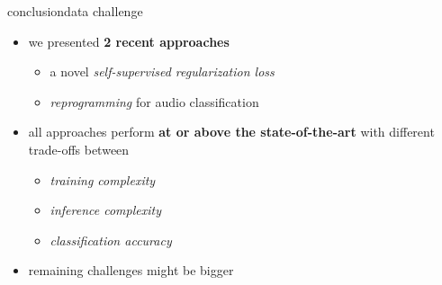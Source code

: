 \begin{frame}{conclusion}{data challenge}
    \vspace{-2mm}
			\begin{itemize}
        \item   we presented \textbf{2 recent approaches}
            \begin{itemize}
                \item   a novel \textit{self-supervised regularization loss}
                \item   \textit{reprogramming} for audio classification
            \end{itemize}
            \bigskip
        \item   all approaches perform \textbf{at or above the state-of-the-art} with different trade-offs between
            \begin{itemize}
                \item   \textit{training complexity}
                \item   \textit{inference complexity}
                \item   \textit{classification accuracy}
            \end{itemize}
				\item remaining challenges might be bigger
    \end{itemize}
\end{frame}

